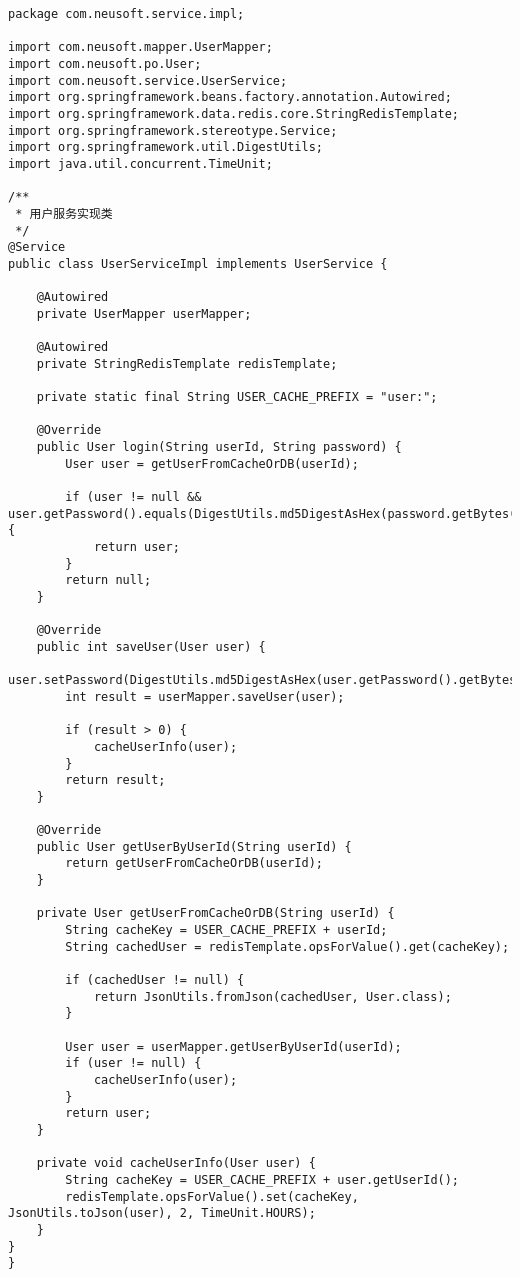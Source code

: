 \documentclass[a4paper,12pt]{article}
\begin{document}
\begin{lstlisting}[caption=用户服务业务逻辑实现]
package com.neusoft.service.impl;

import com.neusoft.mapper.UserMapper;
import com.neusoft.po.User;
import com.neusoft.service.UserService;
import org.springframework.beans.factory.annotation.Autowired;
import org.springframework.data.redis.core.StringRedisTemplate;
import org.springframework.stereotype.Service;
import org.springframework.util.DigestUtils;
import java.util.concurrent.TimeUnit;

/**
 * 用户服务实现类
 */
@Service
public class UserServiceImpl implements UserService {
    
    @Autowired
    private UserMapper userMapper;
    
    @Autowired
    private StringRedisTemplate redisTemplate;
    
    private static final String USER_CACHE_PREFIX = "user:";
    
    @Override
    public User login(String userId, String password) {
        User user = getUserFromCacheOrDB(userId);
        
        if (user != null && user.getPassword().equals(DigestUtils.md5DigestAsHex(password.getBytes()))) {
            return user;
        }
        return null;
    }
    
    @Override
    public int saveUser(User user) {
        user.setPassword(DigestUtils.md5DigestAsHex(user.getPassword().getBytes()));
        int result = userMapper.saveUser(user);
        
        if (result > 0) {
            cacheUserInfo(user);
        }
        return result;
    }
    
    @Override
    public User getUserByUserId(String userId) {
        return getUserFromCacheOrDB(userId);
    }
    
    private User getUserFromCacheOrDB(String userId) {
        String cacheKey = USER_CACHE_PREFIX + userId;
        String cachedUser = redisTemplate.opsForValue().get(cacheKey);
        
        if (cachedUser != null) {
            return JsonUtils.fromJson(cachedUser, User.class);
        }
        
        User user = userMapper.getUserByUserId(userId);
        if (user != null) {
            cacheUserInfo(user);
        }
        return user;
    }
    
    private void cacheUserInfo(User user) {
        String cacheKey = USER_CACHE_PREFIX + user.getUserId();
        redisTemplate.opsForValue().set(cacheKey, JsonUtils.toJson(user), 2, TimeUnit.HOURS);
    }
}
}
\end{lstlisting}
\end{document}
